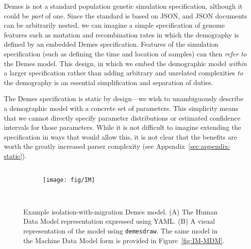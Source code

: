 \documentclass[11pt]{article}
\newcommand{\demesdraw}[0]{\texttt{demesdraw}}
\begin{document}
Demes is not a standard population genetic simulation specification,
although it could be \emph{part} of one.
Since the standard is based on JSON, and JSON documents can be
arbitrarily nested, we can imagine a simple specification
of genome features such as mutation and recombination rates
in which the demography is defined by an embedded Demes specification.
Features of the simulation specification (such as defining
the time and location of samples) can then \emph{refer to} the Demes
model. This design, in which we embed the demographic model
\emph{within} a larger specification rather than adding arbitrary
and unrelated complexities \emph{to} the demography
is an essential simplification and separation of duties.

The Demes specification is static by design---we wish to unambiguously
describe a demographic model with a concrete set of parameters.
This simplicity means that we cannot directly specify parameter distributions
or estimated confidence intervals for those parameters.
While it is not difficult to imagine extending the specification in ways that
would allow this, it is not
clear that the benefits are worth the greatly increased parser complexity
(see Appendix~\ref{sec:appendix-static}).

\begin{figure}[h!]
    \begin{minipage}{0.45\textwidth}
    \begin{subfigure}{\textwidth}
    \caption{}
        \begin{tcolorbox}[equal height group=IM]
            \inputminted[fontsize=\scriptsize,numbersep=5pt]{yaml}{models/IM.yaml}
        \end{tcolorbox}
    \end{subfigure}
    \end{minipage}\hfill%
%
    \begin{minipage}{0.50\textwidth}
    \begin{subfigure}{\textwidth}
    \caption{}
        \begin{tcolorbox}[equal height group=IM, boxsep=0pt]
            \texttt{[image: fig/IM]}
        \end{tcolorbox}
    \end{subfigure}
    \end{minipage}\\

    \caption{
        \label{fig:IM}
        Example isolation-with-migration Demes model. (A) The Human Data Model
        representation expressed using YAML.
        (B) A visual representation of the model using \demesdraw.
        The same model in the Machine Data Model form is provided in
        Figure~\ref{fig:IM-MDM}.
    }
\end{figure}
\end{document}
